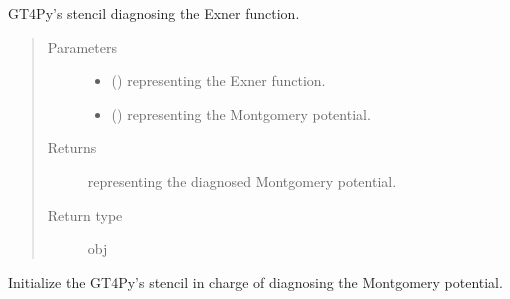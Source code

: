 \documentclass[letterpaper,10pt,english]{sphinxmanual}
\begin{document}
\begin{fulllineitems}
\begin{fulllineitems}
\begin{quote}
\begin{description}
\begin{itemize}
\end{itemize}

\end{description}\end{quote}

\end{fulllineitems}


\begin{fulllineitems}
\label{\detokenize{api:dycore.diagnostic_isentropic.DiagnosticIsentropic._stencil_diagnosing_montgomery_defs}}
GT4Py’s stencil diagnosing the Exner function.
\begin{quote}\begin{description}
\item[{Parameters}] \leavevmode\begin{itemize}
\item {} 
 () \textendash{}  representing the Exner function.

\item {} 
 () \textendash{}  representing the Montgomery potential.

\end{itemize}

\item[{Returns}] \leavevmode
{} representing the diagnosed Montgomery potential.

\item[{Return type}] \leavevmode
obj

\end{description}\end{quote}

\end{fulllineitems}


\begin{fulllineitems}
\label{\detokenize{api:dycore.diagnostic_isentropic.DiagnosticIsentropic._stencil_diagnosing_montgomery_initialize}}
Initialize the GT4Py’s stencil in charge of diagnosing the Montgomery potential.


\end{fulllineitems}
\end{fulllineitems}
\end{document}
